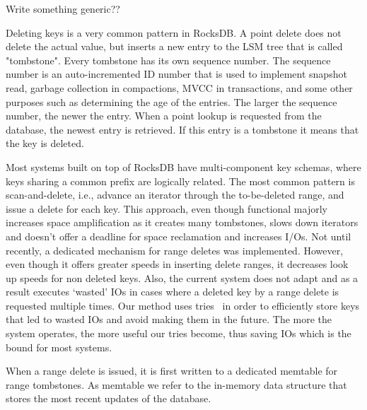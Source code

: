 Write something generic?? 

Deleting keys is a very common pattern in RocksDB.
A point delete  does not delete the actual value, but inserts a new entry to the LSM tree that is called "tombstone".
Every tombstone has its own sequence number.
The sequence number is an auto-incremented ID number that is used to implement snapshot read, garbage collection in compactions, MVCC in transactions, and some other purposes such as determining the age of the entries. 
The larger the sequence number, the newer the entry.
When a point lookup is requested from the database, the newest entry is retrieved. If this entry is a tombstone it means that the key is deleted. 

Most systems built on top of RocksDB have multi-component key schemas, where keys sharing a common prefix are logically related. 
The most common pattern is scan-and-delete, i.e., advance an iterator through the to-be-deleted range, and issue a delete for each key.
This approach, even though functional majorly increases space amplification as it creates many tombstones, slows down iterators and doesn't offer a deadline for space reclamation and increases I/Os. 
Not until recently, a dedicated mechanism for range deletes was implemented. 
However, even though it offers greater speeds in inserting delete ranges, it decreases look up speeds for non deleted keys. 
Also, the current system does not adapt and as a result executes `wasted' IOs in cases where a deleted key by a range delete is requested multiple times. 
Our method uses tries~\cite{Zhang2018a} in order to efficiently store keys that led to wasted IOs and avoid making them in the future. 
The more the system operates, the more useful our tries become, thus saving IOs which is the bound for most systems.

When a range delete is issued, it is first written to a dedicated memtable for range tombstones.
As memtable we refer to the in-memory data structure that stores the most recent updates of the database.

